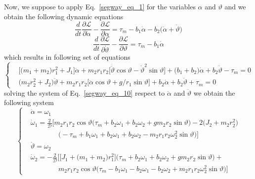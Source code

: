 \documentclass[11pt,a4paper,oneside]{book}
\numberwithin{equation}{section}
\theoremstyle{it}
\theoremstyle{definition}
\begin{document}
Now, we suppose to apply Eq.~\eqref{segway_eq_1} for the variables $\alpha$ 
and $\vartheta$ and we obtain the following dynamic equations
\begin{equation}\label{segway_eq_8}
	\frac{d}{dt}\frac{\partial \mathcal{L}}{\partial \dot{\alpha}} - 
	\frac{\partial \mathcal{L}}{\partial \alpha} = 
	\tau_m-b_1\dot{\alpha}-b_2\big(\dot{\alpha}+\dot{\vartheta}\big)
\end{equation}
\begin{equation}\label{segway_eq_9}
	\frac{d}{dt}\frac{\partial \mathcal{L}}{\partial \dot{\vartheta}} - 
	\frac{\partial \mathcal{L}}{\partial \vartheta} = \tau_m-b_1\dot{\alpha}
\end{equation}
which results in following set of equations
\begin{equation}\label{segway_eq_10}
	\left\lbrace 	\begin{aligned}
		&\Big[\big(m_1+m_2\big)r_1^2+J_1\Big]\ddot{\alpha}+m_2r_1r_2
		\Big[\ddot{\vartheta}\cos\vartheta-\dot{\vartheta}^2\sin\vartheta\Big]+
		\big(b_1+b_2\big)\dot{\alpha}+b_2\dot{\vartheta}-\tau_m=0 \\[8pt]
		&\big(m_2r_2^2+J_2\big)\ddot{\vartheta}+m_2r_1r_2\Big[\ddot{\alpha}\cos\vartheta+
		g/r_1\sin\vartheta\Big]+b_2\dot{\alpha}+b_2\dot{\vartheta}+\tau_m=0
	\end{aligned}\right. 
\end{equation}
solving the system of Eq.~\eqref{segway_eq_10} respect to $\ddot{\alpha}$ and 
$\ddot{\vartheta}$ we obtain the following system
\begin{equation}\label{segway_eq_11}
	\left\lbrace 	\begin{aligned}
		&\dot{\alpha}=\omega_{1} \\[6pt]
		&\dot{\omega}_{1}= \frac{2}{\mathcal{D}}\Bigg[
		m_2r_1r_2\cos\vartheta\Big(\tau_m+b_2\omega_1+b_2\omega_2+
		gm_2r_2\sin\vartheta\Big)-2\Big(J_2+m_2r_2^2\Big)\\[6pt]
		&\qquad\qquad \Big(-\tau_m+b_1\omega_1 
		+b_2\omega_1+b_2\omega_2- m_2r_1r_2\omega_2^2\sin\vartheta\Big)
		\Bigg]\\[6pt]
		&\dot{\vartheta}=\omega_{2} \\[6pt]
		&\dot{\omega}_{2} = 
		-\frac{2}{\mathcal{D}}\Bigg[\Big[J_1+\big(m_1+m_2\big)r_1^2\Big]\Big(
		\tau_m+b_2\omega_1+b_2\omega_2+gm_2r_2\sin\vartheta\Big)+ \\[6pt]
		&\qquad\qquad m_2r_1r_2\cos\vartheta\Big(
		\tau_m-b_1\omega_1-b_2\omega_1-b_2\omega_2+m_2r_1r_2\omega_2^2\sin\vartheta
		\Big)\Bigg]
	\end{aligned}\right. 
\end{equation}
\end{document}
